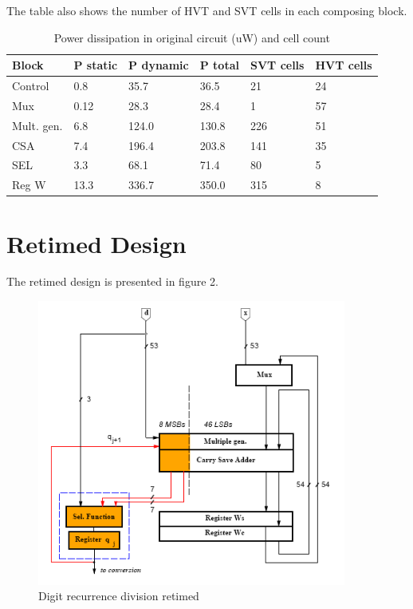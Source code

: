 \documentclass[11pt,a4paper]{article}
\begin{document}
The table also shows the number of HVT and SVT cells in each composing block.

\begin{table}[htbp]
\caption{Power dissipation in original circuit (uW) and cell count}
\begin{center}
\begin{tabular}{|l|l|l|l|l|l|} %
\hline
\textbf{Block}	& \textbf{P static}		& \textbf{P dynamic}	& \textbf{P total} & \textbf{SVT cells} & \textbf{HVT cells}\\ \hline
Control & 0.8 & 35.7 & 36.5 & 21 & 24 \\ \hline
Mux & 0.12 & 28.3 & 28.4 & 1 & 57 	\\ \hline
Mult. gen. & 6.8 & 124.0 & 130.8 & 226 & 51 	\\ \hline
CSA & 7.4 & 196.4 & 203.8 & 141 & 35 	\\ \hline
SEL & 3.3 & 68.1 & 71.4 & 80 & 5 	\\ \hline
Reg W & 13.3 & 336.7 & 350.0 & 315 & 8 	\\ \hline
\end{tabular}
\end{center}
\label{table:powerOriginal}
\end{table}


\section{Retimed Design}

The retimed design is presented in figure 2.

\begin{figure}
	\centering
		\includegraphics[width=4in]{./retiming.PNG}
	\caption{Digit recurrence division retimed}
	\label{fig:retiming}
\end{figure}
\end{document}
